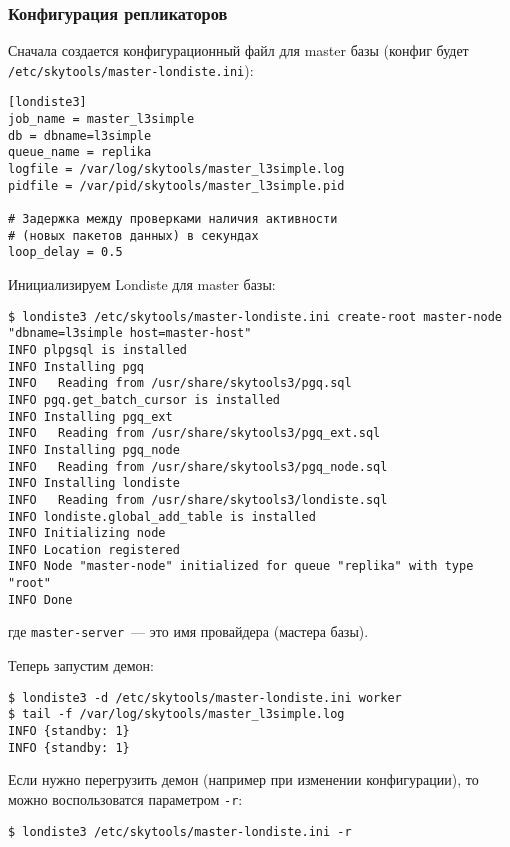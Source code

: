 \subsubsection{Конфигурация репликаторов}

Сначала создается конфигурационный файл для master базы (конфиг будет \lstinline!/etc/skytools/master-londiste.ini!):

\begin{lstlisting}[label=lst:londiste-replica1,caption=Конфигурация репликаторов]
[londiste3]
job_name = master_l3simple
db = dbname=l3simple
queue_name = replika
logfile = /var/log/skytools/master_l3simple.log
pidfile = /var/pid/skytools/master_l3simple.pid

# Задержка между проверками наличия активности
# (новых пакетов данных) в секундах
loop_delay = 0.5
\end{lstlisting}

Инициализируем Londiste для master базы:

\begin{lstlisting}[label=lst:londiste-replica2,caption=Инициализируем Londiste]
$ londiste3 /etc/skytools/master-londiste.ini create-root master-node "dbname=l3simple host=master-host"
INFO plpgsql is installed
INFO Installing pgq
INFO   Reading from /usr/share/skytools3/pgq.sql
INFO pgq.get_batch_cursor is installed
INFO Installing pgq_ext
INFO   Reading from /usr/share/skytools3/pgq_ext.sql
INFO Installing pgq_node
INFO   Reading from /usr/share/skytools3/pgq_node.sql
INFO Installing londiste
INFO   Reading from /usr/share/skytools3/londiste.sql
INFO londiste.global_add_table is installed
INFO Initializing node
INFO Location registered
INFO Node "master-node" initialized for queue "replika" with type "root"
INFO Done
\end{lstlisting}

где \lstinline!master-server!~--- это имя провайдера (мастера базы).

Теперь запустим демон:

\begin{lstlisting}[label=lst:londiste-replica3,caption=Запускаем демон для master базы]
$ londiste3 -d /etc/skytools/master-londiste.ini worker
$ tail -f /var/log/skytools/master_l3simple.log
INFO {standby: 1}
INFO {standby: 1}
\end{lstlisting}

Если нужно перегрузить демон (например при изменении конфигурации), то можно воспользоватся параметром \lstinline!-r!:

\begin{lstlisting}[label=lst:londiste-replica4,caption=Перегрузка демона]
$ londiste3 /etc/skytools/master-londiste.ini -r
\end{lstlisting}

